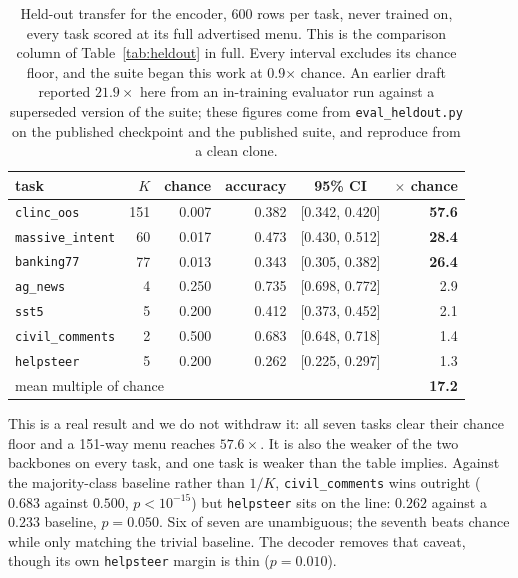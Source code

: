 \begin{table}[t]
\centering
\begin{tabular}{lrrrcr}
\toprule
task & $K$ & chance & accuracy & 95\% CI & $\times$ chance \\
\midrule
\texttt{clinc\_oos}      & 151 & 0.007 & 0.382 & [0.342, 0.420] & \textbf{57.6} \\
\texttt{massive\_intent} &  60 & 0.017 & 0.473 & [0.430, 0.512] & \textbf{28.4} \\
\texttt{banking77}       &  77 & 0.013 & 0.343 & [0.305, 0.382] & \textbf{26.4} \\
\texttt{ag\_news}        &   4 & 0.250 & 0.735 & [0.698, 0.772] & 2.9 \\
\texttt{sst5}            &   5 & 0.200 & 0.412 & [0.373, 0.452] & 2.1 \\
\texttt{civil\_comments} &   2 & 0.500 & 0.683 & [0.648, 0.718] & 1.4 \\
\texttt{helpsteer}       &   5 & 0.200 & 0.262 & [0.225, 0.297] & 1.3 \\
\midrule
\multicolumn{5}{l}{mean multiple of chance} & \textbf{17.2} \\
\bottomrule
\end{tabular}
\caption{Held-out transfer for the encoder, 600 rows per task, never
trained on, every task scored at its full advertised menu. This is the
comparison column of Table~\ref{tab:heldout} in full. Every interval
excludes its chance floor, and the suite began this work at 0.9$\times$
chance. An earlier draft reported $21.9\times$ here from an in-training
evaluator run against a superseded version of the suite; these figures
come from \texttt{eval\_heldout.py} on the published checkpoint and the
published suite, and reproduce from a clean clone.}
\label{tab:heldout-enc}
\end{table}

This is a real result and we do not withdraw it: all seven tasks clear
their chance floor and a 151-way menu reaches $57.6\times$. It is also
the weaker of the two backbones on every task, and one task is weaker
than the table implies. Against the majority-class baseline rather than
$1/K$, \texttt{civil\_comments} wins outright ($0.683$ against $0.500$,
$p<10^{-15}$) but \texttt{helpsteer} sits on the line: $0.262$ against a
$0.233$ baseline, $p = 0.050$. Six of seven are unambiguous; the seventh
beats chance while only matching the trivial baseline. The decoder
removes that caveat, though its own \texttt{helpsteer} margin is thin
($p = 0.010$).

